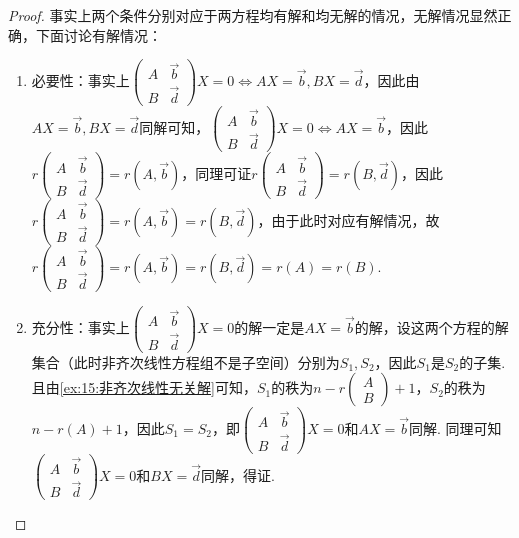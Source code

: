 \begin{proof}
事实上两个条件分别对应于两方程均有解和均无解的情况，无解情况显然正确，下面讨论有解情况：
\begin{enumerate}
    \item 必要性：事实上$\begin{pmatrix}
                A & \vec{b} \\ B & \vec{d}
            \end{pmatrix}X=0\iff AX=\vec{b},BX=\vec{d}$，因此由$AX=\vec{b},BX=\vec{d}$同解可知，$\begin{pmatrix}
                A & \vec{b} \\ B & \vec{d}
            \end{pmatrix}X=0\iff AX=\vec{b}$，因此$r\begin{pmatrix}
                A & \vec{b} \\ B & \vec{d}
            \end{pmatrix}=r(A,\vec{b})$，同理可证$r\begin{pmatrix}
                A & \vec{b} \\ B & \vec{d}
            \end{pmatrix}=r(B,\vec{d})$，因此$r\begin{pmatrix}
                A & \vec{b} \\ B & \vec{d}
            \end{pmatrix}=r(A,\vec{b})=r(B,\vec{d})$，由于此时对应有解情况，故$r\begin{pmatrix}
                A & \vec{b} \\ B & \vec{d}
            \end{pmatrix}=r(A,\vec{b})=r(B,\vec{d})=r(A)=r(B)$.
    \item 充分性：事实上$\begin{pmatrix}
                A & \vec{b} \\ B & \vec{d}
            \end{pmatrix}X=0$的解一定是$AX=\vec{b}$的解，设这两个方程的解集合（此时非齐次线性方程组不是子空间）分别为$S_1,S_2$，因此$S_1$是$S_2$的子集. 且由\autoref{ex:15:非齐次线性无关解}可知，$S_1$的秩为$n-r\begin{pmatrix}
                A \\ B
            \end{pmatrix}+1$，$S_2$的秩为$n-r(A)+1$，因此$S_1=S_2$，即$\begin{pmatrix}
                A & \vec{b} \\ B & \vec{d}
            \end{pmatrix}X=0$和$AX=\vec{b}$同解. 同理可知$\begin{pmatrix}
                A & \vec{b} \\ B & \vec{d}
            \end{pmatrix}X=0$和$BX=\vec{d}$同解，得证.
\end{enumerate}
\end{proof}

